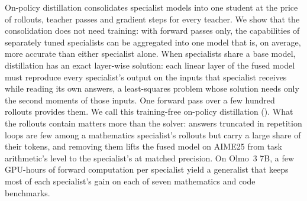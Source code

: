 On-policy distillation consolidates specialist models into one student at the
price of rollouts, teacher passes and gradient steps for every teacher. We show
that the consolidation does not need training: with forward passes only, the
capabilities of separately tuned specialists can be aggregated into one model
that is, on average, more accurate than either specialist alone. When
specialists share a base model, distillation has an exact layer-wise solution:
each linear layer of the fused model must reproduce every specialist's output on
the inputs that specialist receives while reading its own answers, a
least-squares problem whose solution needs only the second moments of those
inputs. One forward pass over a few hundred rollouts provides them. We call this
training-free on-policy distillation (\method). What the rollouts contain
matters more than the solver: answers truncated in repetition loops are few
among a mathematics specialist's rollouts but carry a large share of their
tokens, and removing them lifts the fused model on AIME25 from task arithmetic's
level to the specialist's at matched precision. On Olmo~3 7B, a few GPU-hours of
forward computation per specialist yield a generalist that keeps most of each
specialist's gain on each of seven mathematics and code benchmarks.
